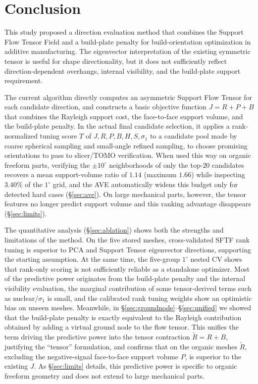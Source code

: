 \documentclass[11pt,a4paper]{article}
\begin{document}
\section{Conclusion}

This study proposed a direction evaluation method that combines the Support Flow Tensor Field and a build-plate penalty for build-orientation optimization in additive manufacturing.
The eigenvector interpretation of the existing symmetric tensor is useful for shape directionality, but
it does not sufficiently reflect direction-dependent overhangs, internal visibility, and the build-plate support requirement.

The current algorithm directly computes an asymmetric Support Flow Tensor for each candidate direction, and
constructs a basic objective function $J=R+P+B$ that combines the Rayleigh support cost, the face-to-face support volume, and the build-plate penalty.
In the actual final candidate selection, it applies a rank-normalized tuning score $T$ of $J,R,P,B,H,S,\sigma_1$
to a candidate pool made by coarse spherical sampling and small-angle refined sampling,
to choose promising orientations to pass to slicer/TOMO verification.
When used this way on organic freeform parts, verifying the $\pm 10^\circ$ neighborhoods of only the top-$20$ candidates recovers a mean
support-volume ratio of $1.14$ (maximum $1.66$) while inspecting $3.40\%$ of the $1^\circ$ grid, and the
AVE automatically widens this budget only for detected hard cases (\S\ref{sec:ave}). On large mechanical parts, however, the tensor features no longer predict support volume and this ranking advantage disappears (\S\ref{sec:limits}).

The quantitative analysis (\S\ref{sec:ablation}) shows both the strengths and limitations of the method.
On the five stored meshes, cross-validated SFTF rank tuning is superior to PCA and Support Tensor eigenvector directions, supporting the starting assumption.
At the same time, the five-group $1^\circ$ nested CV shows that rank-only scoring is not sufficiently reliable as a standalone optimizer.
Most of the predictive power originates from the build-plate penalty and the internal visibility evaluation,
the marginal contribution of some tensor-derived terms such as nuclear/$\sigma_1$ is small, and
the calibrated rank tuning weights show an optimistic bias on unseen meshes.
Meanwhile, in \S\ref{sec:groundnode}--\S\ref{sec:unified} we showed that the build-plate penalty is exactly equivalent
to the Rayleigh contribution obtained by adding a virtual ground node to the flow tensor.
This unifies the term driving the predictive power into the tensor contraction $\tilde R=R+B$, justifying the ``tensor'' formulation,
and confirms that on the organic meshes $\tilde R$, excluding the negative-signal face-to-face support volume $P$, is superior to the existing $J$. As \S\ref{sec:limits} details, this predictive power is specific to organic freeform geometry and does not extend to large mechanical parts.
\end{document}
